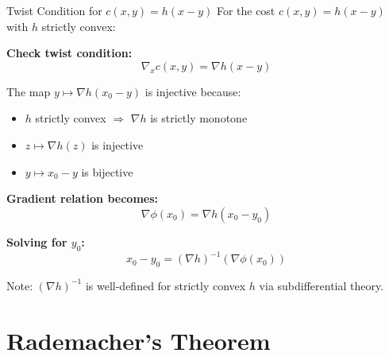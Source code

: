 \documentclass[aspectratio=169]{beamer}
\begin{document}
\begin{frame}{Twist Condition for $c(x,y) = h(x-y)$}
For the cost $c(x,y) = h(x-y)$ with $h$ strictly convex:

\vspace{0.3cm}
\textbf{Check twist condition:}
\[
\nabla_x c(x,y) = \nabla h(x-y)
\]

The map $y \mapsto \nabla h(x_0 - y)$ is injective because:
\begin{itemize}
    \item $h$ strictly convex $\Rightarrow$ $\nabla h$ is strictly monotone
    \item $z \mapsto \nabla h(z)$ is injective
    \item $y \mapsto x_0 - y$ is bijective
\end{itemize}

\vspace{0.3cm}
\textbf{Gradient relation becomes:}
\[
\nabla\phi(x_0) = \nabla h(x_0 - y_0)
\]

\vspace{0.2cm}
\textbf{Solving for $y_0$:}
\[
\boxed{x_0 - y_0 = (\nabla h)^{-1}(\nabla\phi(x_0))}
\]

Note: $(\nabla h)^{-1}$ is well-defined for strictly convex $h$ via subdifferential theory.
\end{frame}

\section{Rademacher's Theorem}
\end{document}
